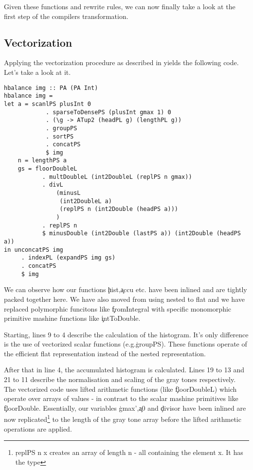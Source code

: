   Given these functions and rewrite rules, we can now finally take a look at the first step of the compilers transformation.
  
  \subsection{Vectorization}
    Applying the vectorization procedure as described in \cite{Harness2008} yields the following code. Let's take a look  at it.
    
    \begin{lstlisting}
hbalance img :: PA (PA Int)
hbalance img = 
let a = scanlPS plusInt 0
            . sparseToDensePS (plusInt gmax 1) 0
            . (\g -> ATup2 (headPL g) (lengthPL g))
            . groupPS
            . sortPS
            . concatPS
            $ img
    n = lengthPS a
    gs = floorDoubleL
           . multDoubleL (int2DoubleL (replPS n gmax))
           . divL
               (minusL
                (int2DoubleL a)
                (replPS n (int2Double (headPS a)))
               )
           . replPS n
           $ minusDouble (int2Double (lastPS a)) (int2Double (headPS a))
in unconcatPS img
     . indexPL (expandPS img gs)
     . concatPS
     $ img
    \end{lstlisting}
    We can observe how our functions \c{hist},\c{accu} etc. have been inlined and are tightly packed together here.
    We have also moved from using nested \pan to flat \pav and we have replaced polymorphic funcitons like \c{fromIntegral}
    with specific monomorphic primitive mashine functions like \c{intToDouble}.
    
    Starting, lines 9 to 4 describe the calculation of the histogram.
    It's only difference is the use of vectorized scalar functions (e.g.\c{groupPS}). These functions operate of the efficient flat
    representation instead of the nested representation.
    
    
    After that in line 4, the accumulated histogram is calculated. Lines 19 to 13 and 21 to 11
    describe the normalisation and scaling of the gray tones respectively. The vectorized code uses
    lifted arithmetic functions (like \c{floorDoubleL}) which operate over arrays of values - in contrast to
    the scalar mashine primitives like \c{floorDouble}. Essentially, our variables \c{gmax'},\c{a0} and \c{divisor}
    have been inlined are now replicated\footnote{\c{replPS n x} creates an array of length n - all containing the element x. It has the type }
    to the length of the gray tone array before the lifted arithmetic operations are applied.
    
